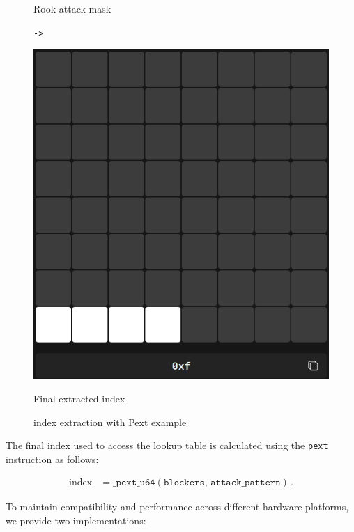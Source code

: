 \begin{figure}[H]
\begin{minipage}[c]{0.3\textwidth}
        \caption*{Rook attack mask}
    \end{minipage}
    \hfill
    \begin{minipage}[c]{0.05\textwidth}
        \centering
        \Huge\texttt{->}
    \end{minipage}
    \hfill
    \begin{minipage}[c]{0.3\textwidth}
        \centering
        \includegraphics[width=\textwidth]{Imagenes/pext_final_index.png}
        \caption*{Final extracted index}
    \end{minipage}
    \caption{index extraction with Pext example}
    \label{fig:pext_bitboards}
\end{figure}

\noindent The final index used to access the lookup table is calculated using the \texttt{pext} instruction as follows:

\begin{align*}
    \text{index}
    &= \texttt{\_pext\_u64}(\texttt{blockers},\,\texttt{attack\_pattern})\,.
\end{align*}

\noindent To maintain compatibility and performance across different hardware platforms, we provide two implementations:

